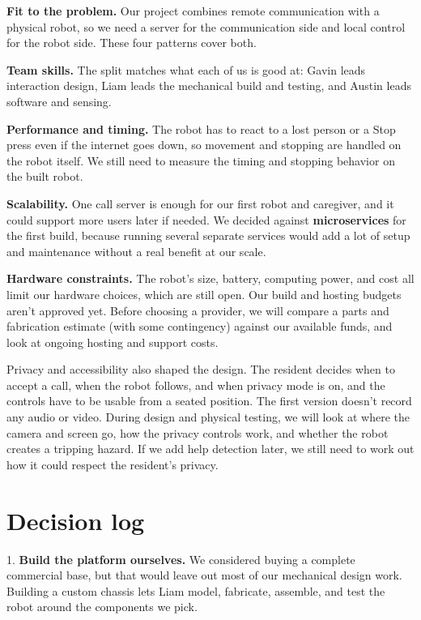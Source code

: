 \documentclass[12pt,letterpaper]{article}
\begin{document}
\textbf{Fit to the problem.} Our project combines remote communication with a physical robot, so we need a server for the communication side and local control for the robot side. These four patterns cover both.

\textbf{Team skills.} The split matches what each of us is good at: Gavin leads interaction design, Liam leads the mechanical build and testing, and Austin leads software and sensing.

\textbf{Performance and timing.} The robot has to react to a lost person or a Stop press even if the internet goes down, so movement and stopping are handled on the robot itself. We still need to measure the timing and stopping behavior on the built robot.

\textbf{Scalability.} One call server is enough for our first robot and caregiver, and it could support more users later if needed. We decided against \textbf{microservices} for the first build, because running several separate services would add a lot of setup and maintenance without a real benefit at our scale.

\textbf{Hardware constraints.} The robot's size, battery, computing power, and cost all limit our hardware choices, which are still open. Our build and hosting budgets aren't approved yet. Before choosing a provider, we will compare a parts and fabrication estimate (with some contingency) against our available funds, and look at ongoing hosting and support costs.

Privacy and accessibility also shaped the design. The resident decides when to accept a call, when the robot follows, and when privacy mode is on, and the controls have to be usable from a seated position. The first version doesn't record any audio or video. During design and physical testing, we will look at where the camera and screen go, how the privacy controls work, and whether the robot creates a tripping hazard. If we add help detection later, we still need to work out how it could respect the resident's privacy.

\section{Decision log}

1. \textbf{Build the platform ourselves.} We considered buying a complete commercial base, but that would leave out most of our mechanical design work. Building a custom chassis lets Liam model, fabricate, assemble, and test the robot around the components we pick.
\end{document}
